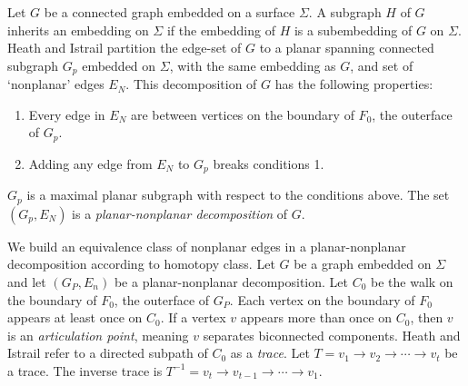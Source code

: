 Let $G$ be a connected graph embedded on a surface $\Sigma$. A subgraph $H$ of $G$ inherits an embedding on $\Sigma$ if the embedding of $H$ is a subembedding of $G$ on $\Sigma$. Heath and Istrail partition the edge-set of \(G\) to a planar spanning connected subgraph \(G_p\) embedded on $\Sigma$, with the same embedding as $G$, and set of `nonplanar' edges $E_N$. This decomposition of $G$ has the following properties:
\begin{enumerate}
	\item Every edge in \(E_N\) are between vertices on the boundary of $F_0$, the outerface of $G_p$.
	\item Adding any edge from $E_N$ to \(G_p\) breaks conditions 1.
\end{enumerate}
$G_p$ is a maximal planar subgraph with respect to the conditions above. The set $(G_p, E_N)$ is a \textit{planar-nonplanar decomposition} of $G$. 


We build an equivalence class of nonplanar edges in a planar-nonplanar decomposition according to homotopy class. Let $G$ be a graph embedded on $\Sigma$ and let $(G_P, E_n)$ be a planar-nonplanar decomposition. Let \(C_0\) be the walk on the boundary of \(F_0\), the outerface of $G_P$. Each vertex on the boundary of \(F_0\) appears at least once on $C_0$. If a vertex $v$ appears more than once on $C_0$, then $v$ is an \textit{articulation point}, meaning $v$ separates biconnected components. Heath and Istrail refer to a directed subpath of \(C_0\) as a \textit{trace}. Let \(T = v_1 \rightarrow v_2 \rightarrow \cdots \rightarrow v_t\) be a trace. The inverse trace is \(T^{-1} = v_t \rightarrow v_{t-1} \rightarrow \cdots \rightarrow v_1\).

